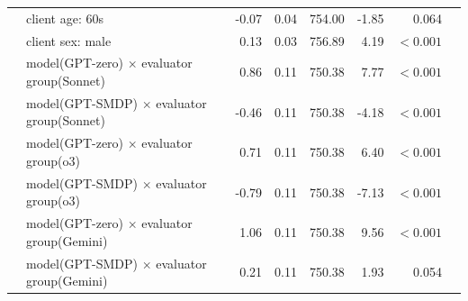 \documentclass{wiley-article}
\begin{document}
{\begin{longtable}{@{}l p{} rrrrrr@{}}
        & client age: 60s                                         & -0.07 & 0.04 & 754.00 &  -1.85 & 0.064 \\
        & client sex: male                                        &  0.13 & 0.03 & 756.89 &   4.19 & $<\!0.001$ \\
        & model(GPT-zero) $\times$ evaluator group(Sonnet)        &  0.86 & 0.11 & 750.38 &   7.77 & $<\!0.001$ \\
        & model(GPT-SMDP) $\times$ evaluator group(Sonnet)        & -0.46 & 0.11 & 750.38 &  -4.18 & $<\!0.001$ \\
        & model(GPT-zero) $\times$ evaluator group(o3)            &  0.71 & 0.11 & 750.38 &   6.40 & $<\!0.001$ \\
        & model(GPT-SMDP) $\times$ evaluator group(o3)            & -0.79 & 0.11 & 750.38 &  -7.13 & $<\!0.001$ \\
        & model(GPT-zero) $\times$ evaluator group(Gemini)        &  1.06 & 0.11 & 750.38 &   9.56 & $<\!0.001$ \\
        & model(GPT-SMDP) $\times$ evaluator group(Gemini)        &  0.21 & 0.11 & 750.38 &   1.93 & 0.054 \\
\end{longtable}
} %
\end{document}
